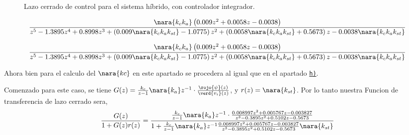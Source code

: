 \begin{figure}[h]
  \caption{Lazo cerrado de control para el sistema híbrido, con controlador integrador.}\label{fig:control-prop-hibrido}
\end{figure}



\begin{equation}
    \frac{ \nara{k_c k_a} \left( 0.009 z^2 + 0.0058 z - 0.0038 \right)}
    { z^5 -1.3895z^4 + 0.8998z^3 + \left( 0.009\nara{k_c k_a k_{st}}  -1.0775 \right) z^2 
    + \left(0.0058 \nara{k_c k_a k_{st}}   + 0.5673 \right) z 
    -0.0038 \nara{k_c k_a k_{st}} }
\end{equation}

\begin{equation}
    \frac{ \nara{k_c k_a} \left( 0.009 z^2 + 0.0058 z - 0.0038 \right)}
    { z^5 -1.3895z^4 + 0.8998z^3 + \left( 0.009\nara{k_c k_a k_{st}}  -1.0775 \right) z^2 
    + \left(0.0058 \nara{k_c k_a k_{st}}   + 0.5673 \right) z 
    -0.0038 \nara{k_c k_a k_{st}} }
\end{equation}


Ahora bien para el calculo del $\nara{kc}$ en este apartado se procedera al igual que en el apartado \hyperref[pregunta-h]{\texttt{h)}}.

Comenzado para este caso, se tiene $G(z) = \frac{k_{c}}{z-1}\nara{ k_{a}} z^{-1} \cdot \frac{\rojo{\psi}(z)}{\verd{v_i}(z)}$,
y $r(z) = \nara{k_{st}}$.  Por lo tanto nuestra Funcion de transferencia de lazo cerrado sera,
\begin{equation}
    \frac{G(z)}{1 + G(z)r(z)} = \dfrac{\frac{k_{c}}{z-1}\nara{k_a} z^{-1} \cdot\frac{0.008997z^2 + 0.005767 z - 0.003827}
    {z^3 - 0.3895 z^2 + 0.5102 z -0.5673}}
    {1+\frac{k_{c}}{z-1}\nara{k_a} z^{-1} \frac{0.008997z^2 + 0.005767 z - 0.003827}
    {z^3 - 0.3895 z^2 + 0.5102 z -0.5673}\nara{k_{st}}}
\end{equation}


